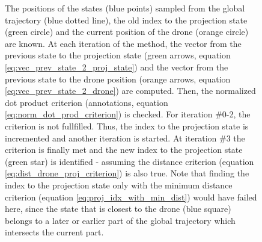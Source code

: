 \begin{itemize}
\begin{figure}
{            The positions of the states (blue points)
            sampled from the global trajectory (blue dotted line),
            the old index to the projection state (green circle)
            and the current position of the drone (orange circle) are known.
            At each iteration of the method,
            the vector from the previous state 
            to the projection state 
            (green arrows, equation \ref{eq:vec_prev_state_2_proj_state})
            and the vector from the previous state to the drone position (orange arrows, equation \ref{eq:vec_prev_state_2_drone})
            are computed. 
            Then, the normalized dot product criterion (annotations, equation \ref{eq:norm_dot_prod_criterion}) is checked. 
            For iteration \#0-2, the criterion is not fullfilled.
            Thus, the index to the projection state is incremented
            and another iteration is started.
            At iteration \#3 the criterion is finally met and the 
            new index to the projection state (green star) is identified -
            assuming the distance criterion (equation \ref{eq:dist_drone_proj_criterion}) is also true. 
            Note that finding the index to the projection state 
            only with the minimum distance criterion (equation \ref{eq:proj_idx_with_min_dist}) would have failed here,
            since the state that is closest to the drone (blue square) 
            belongs to a later or earlier part of the global trajectory which intersects the current part.
        \label{fig:expert_system_projection}}
    \end{figure}



\end{itemize}
